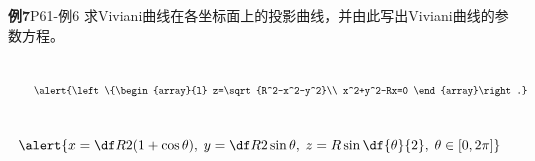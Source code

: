 \begin{frame}
	\linespread{1.2}
	\begin{exampleblock}{{\bf 例7}\hfill P61-例6}
		求Viviani曲线在各坐标面上的投影曲线，并由此写出Viviani曲线的参数方程。
	\end{exampleblock}\pause 
	\begin{columns}
			\begin{center}
			\end{center}\pause 
			$$\alert{\left\{\begin{array}{l}
				z=\sqrt{R^2-x^2-y^2}\\
				x^2+y^2-Rx=0
			\end{array}\right.}$$
	\end{columns}
\end{frame}

\begin{frame}
	\linespread{1.2}
	\begin{center}
	\end{center}\pause 
	\vspace{-1ex}
	$$\alert{x=\df R2(1+\cos\theta),\;y=\df
	R2\sin\theta,\;z=R\sin\df{\theta}{2},\;\theta\in[0,2\pi]}$$
\end{frame}

